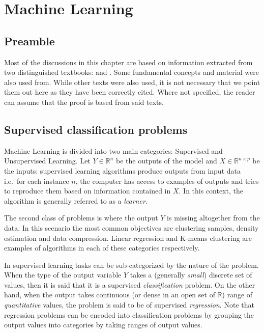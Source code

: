 \chapter{Machine Learning}
\label{ch:machineLearning}


\section{Preamble}\label{section-preamble}
Most of the discussions in this chapter are based on information extracted from two distinguished textbooks: \textcite{bishop-patternRecognition} and \textcite{hastie-elemstatslearn}. Some fundamental concepts and material were also used from\label{scikit-learn}. While other texts were also used, it is not necessary that we point them out here as they have been correctly cited. Where not specified, the reader can assume that the proof is based from said texts.


\section{ Supervised classification problems}\label{section-supervised-learning}


Machine Learning is divided into two main categories: Supervised and Unsupervised Learning. Let $Y \in \mathbb{R}^n$ be the outputs of the model and $X \in \mathbb{R}^{n \times p}$ be the inputs: supervised learning algorithms produce outputs from input data i.e.\ for each instance $n$, the computer has access to examples of outputs and tries to reproduce them based on information contained in $X$. In this context, the algorithm is generally referred to as a \textit{learner}.

The second class of problems is where the output $Y$ is missing altogether from the data. In this scenario the most common objectives are clustering samples, density estimation and data compression. Linear regression and K-means clustering are examples of algorithms in each of these categories respectively.


In supervised learning tasks can be sub-categorized by the nature of the problem. When the type of the output variable $Y$ takes a (generally \textit{small}) discrete set of values, then it is said that it is a supervised \textit{classification} problem. On the other hand, when the output takes continuous (or dense in an open set of $\mathbb{R}$) range of \textit{quantitative} values, the problem is said to be of supervised \textit{regression}. Note that regression problems can be encoded into classification problems by grouping the output values into categories by taking ranges of output values.

